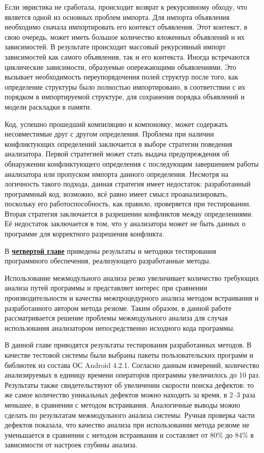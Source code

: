 Если эвристика не сработала, происходит возврат к рекурсивному обходу, что является одной из основных проблем импорта. Для импорта объявления необходимо сначала импортировать его контекст объявления. Этот контекст, в свою очередь, может иметь большое количество вложенных объявлений и их зависимостей. В результате происходит массовый рекурсивный импорт зависимостей как самого объявления, так и его контекста. Иногда встречаются циклические зависимости, образуемые опережающими объявлениями. Это вызывает необходимость переупорядочения  полей структур после того, как определение структуры было полностью импортировано, в соответствии с их порядком в импортируемой структуре, для сохранения порядка объявлений и модели раскладки в памяти.

Код, успешно прошедший компиляцию и компоновку, может содержать несовместимые друг с другом определения. Проблема при наличии конфликтующих определений заключается в выборе стратегии поведения анализатора. Первой стратегией может стать выдача предупреждения об обнаружении конфликтующего определения с последующим завершением работы анализатора или пропуском импорта данного определения. Несмотря на логичность такого подхода, данная стратегия имеет недостаток: разработанный программный код, возможно, всё равно имеет смысл проанализировать, поскольку его работоспособность, как правило, проверяется при тестировании. Вторая стратегия заключается в разрешении конфликтов между определениями. Её недостаток заключается в том, что у анализатора может не быть данных о программе для корректного разрешения конфликта.


В \underline{\textbf{четвертой главе}} приведены результаты и методики тестирования программного обеспечения, реализующего разработанные методы.

Использование межмодульного анализа резко увеличивает количество требующих анализа путей программы и представляет интерес при сравнении производительности и качества межпроцедурного анализа методом встраивания и разработанного автором метода резюме. Таким образом, в данной работе рассматривается решение проблемы межмодульного анализа для случая использования анализатором непосредственно исходного кода программы.

В данной главе приводятся результаты тестирования разработанных методов. В качестве тестовой системы были выбраны пакеты пользовательских программ и библиотек из состава ОС Android 4.2.1. Согласно данным измерений, количество анализируемых в единицу времени операторов программы увеличилось до 10 раз. Результаты также свидетельствуют об увеличении скорости поиска дефектов: то же самое количество уникальных дефектов можно находить за время, в 2--3 раза меньшее, в сравнении с методом встраивания. Аналогичные выводы можно сделать по результатам межмодульного анализа системы. Ручная проверка части дефектов показала, что качество анализа при использовании метода резюме не уменьшается в сравнении с методом встраивания и составляет от 80\% до 84\% в зависимости от настроек глубины анализа.

